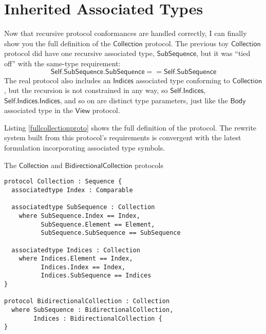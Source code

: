 \documentclass[headsepline,bibliography=totoc]{scrreport}
\newcommand{\namesym}[1]{\mathsf{#1}}
\newcommand{\genericparam}[1]{\bm{\mathsf{#1}}}
\newcommand{\proto}[1]{\bm{\mathsf{#1}}}
\theoremstyle{definition}
\theoremstyle{definition}
\theoremstyle{definition}
\begin{document}
\section{Inherited Associated Types}\label{inheritedassoctypes}
Now that recursive protocol conformances are handled correctly, I can finally show you the full definition of the $\proto{Collection}$ protocol. The previous toy $\proto{Collection}$ protocol did have one recursive associated type, $\namesym{SubSequence}$, but it was ``tied off'' with the same-type requirement:
\[\genericparam{Self}.\namesym{SubSequence}.\namesym{SubSequence}==\genericparam{Self}.\namesym{SubSequence}\]
The real protocol also includes an $\namesym{Indices}$ associated type conforming to $\proto{Collection}$, but the recursion is not constrained in any way, so $\genericparam{Self}.\namesym{Indices}$, $\genericparam{Self}.\namesym{Indices}.\namesym{Indices}$, and so on are distinct type parameters, just like the $\namesym{Body}$ associated type in the $\proto{View}$ protocol.

Listing \ref{fullcollectionproto} shows the full definition of the protocol. The rewrite system built from this protocol's requirements is convergent with the latest formulation incorporating associated type symbols.
\begin{listing}\caption{The $\proto{Collection}$ and $\proto{BidirectionalCollection}$ protocols}\label{fullcollectionproto}
\begin{Verbatim}
protocol Collection : Sequence {
  associatedtype Index : Comparable

  associatedtype SubSequence : Collection
    where SubSequence.Index == Index,
          SubSequence.Element == Element,
          SubSequence.SubSequence == SubSequence

  associatedtype Indices : Collection
    where Indices.Element == Index,
          Indices.Index == Index,
          Indices.SubSequence == Indices
}

protocol BidirectionalCollection : Collection
  where SubSequence : BidirectionalCollection,
        Indices : BidirectionalCollection {
}
\end{Verbatim}
\end{listing}
\end{document}
